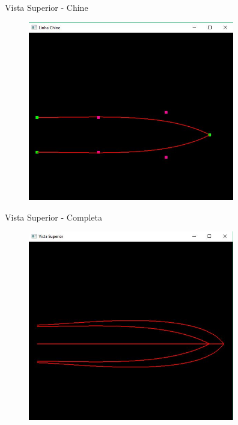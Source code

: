 \documentclass{beamer}
\begin{document}
\begin{frame}{Vista Superior - Chine}
\begin{figure}[h]	
\centering
\includegraphics[width=9cm]{linhachineplan}
\end{figure}
\end{frame}
\begin{frame}{Vista Superior - Completa}
\begin{figure}[h]	
\centering
\includegraphics[width=9cm]{superioropengl}
\end{figure}
\end{frame}
\end{document}

